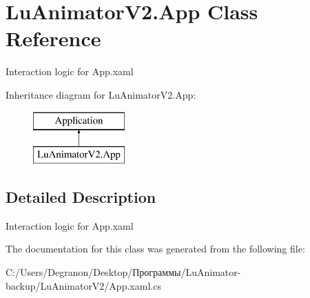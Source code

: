 \hypertarget{class_lu_animator_v2_1_1_app}{}\section{Lu\+Animator\+V2.\+App Class Reference}
\label{class_lu_animator_v2_1_1_app}


Interaction logic for App.\+xaml  


Inheritance diagram for Lu\+Animator\+V2.\+App\+:\begin{figure}[H]
\begin{center}
\leavevmode
\includegraphics[height=2.000000cm]{class_lu_animator_v2_1_1_app}
\end{center}
\end{figure}


\subsection{Detailed Description}
Interaction logic for App.\+xaml 



The documentation for this class was generated from the following file\+:\begin{DoxyCompactItemize}
\item 
C\+:/\+Users/\+Degranon/\+Desktop/Программы/\+Lu\+Animator-\/backup/\+Lu\+Animator\+V2/App.\+xaml.\+cs\end{DoxyCompactItemize}
